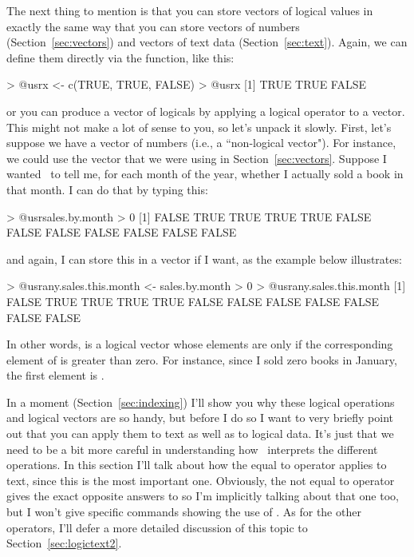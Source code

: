 The next thing to mention is that you can store vectors of logical values in exactly the same way that you can store vectors of numbers (Section~\ref{sec:vectors}) and vectors of text data (Section~\ref{sec:text}). Again, we can define them directly via the  function, like this:
\begin{rblock1}
> @usr{x <- c(TRUE, TRUE, FALSE)}
> @usr{x}
[1]  TRUE  TRUE FALSE
\end{rblock1}
or you can produce a vector of logicals by applying a logical operator to a vector. This might not make a lot of sense to you, so let's unpack it slowly. First, let's suppose we have a vector of numbers (i.e., a ``non-logical vector"). For instance, we could use the  vector that we were using in Section~\ref{sec:vectors}. Suppose I wanted \R\ to tell me, for each month of the year, whether I actually sold a book in that month. I can do that by typing this: 
\begin{rblock1}
> @usr{sales.by.month > 0}
 [1] FALSE  TRUE  TRUE  TRUE  TRUE FALSE FALSE FALSE FALSE FALSE FALSE FALSE
\end{rblock1}
and again, I can store this in a vector if I want, as the example below illustrates:
\begin{rblock1}
> @usr{any.sales.this.month <- sales.by.month > 0}
> @usr{any.sales.this.month}
 [1] FALSE  TRUE  TRUE  TRUE  TRUE FALSE FALSE FALSE FALSE FALSE FALSE FALSE 
\end{rblock1}
In other words,  is a logical vector whose elements are  only if the corresponding element of  is greater than zero. For instance, since I sold zero books in January, the first element is . 



In a moment (Section~\ref{sec:indexing}) I'll show you why these logical operations and logical vectors are so handy, but before I do so I want to very briefly point out that you can apply them to text as well as to logical data. It's just that we need to be a bit more careful in understanding how \R\ interprets the different operations. In this section I'll talk about how the equal to operator \rtext{==} applies to text, since this is the most important one. Obviously, the not equal to operator \rtext{!=} gives the exact opposite answers to \rtext{==} so I'm implicitly talking about that one too, but I won't give specific commands showing the use of \rtext{!=}. As for the other operators, I'll defer a more detailed discussion of this topic to Section~\ref{sec:logictext2}. 

